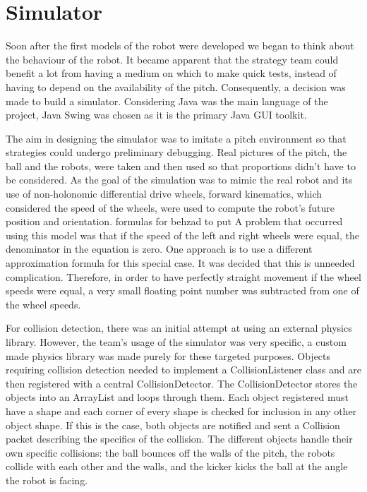 \section{Simulator}

Soon after the first models of the robot were developed we began to think about the behaviour of the robot. It became apparent that the strategy team could benefit a lot from having a medium on which to make quick tests, instead of having to depend on the availability of the pitch. Consequently, a decision was made to build a simulator. Considering Java was the main language of the project, Java Swing was chosen as it is the primary Java GUI toolkit.\linebreak

The aim in designing the simulator was to imitate a pitch environment so that strategies could undergo preliminary debugging. Real pictures of the pitch, the ball and the robots, were taken and then used so that proportions didn’t have to be considered. As the goal of the simulation was to mimic the real robot and its use of  non-holonomic differential drive wheels, forward kinematics, which considered the speed of the wheels, were used to compute the robot’s future position and orientation.\linebreak
formulas for behzad to put
A problem that occurred using this model was that if the speed of the left and right wheels were equal, the denominator in the equation is zero. One approach is to use a different approximation formula for this special case. It was decided that this is unneeded complication. Therefore, in order to have perfectly straight movement if the wheel speeds were equal, a very small floating point number was subtracted from one of the wheel speeds.\linebreak

For collision detection, there was an initial attempt at using an external physics library. However, the team’s usage of the simulator was very specific, a custom made physics library was made purely for these targeted purposes. Objects requiring collision detection needed to implement a CollisionListener class and are then registered with a central CollisionDetector. The CollisionDetector stores the objects into an ArrayList and loops through them. Each object registered must have a shape and each corner of every shape is checked for inclusion in any other object shape. If this is the case, both objects are notified and sent a Collision packet describing the specifics of the collision. The different objects handle their own specific collisions: the ball bounces off the walls of the pitch, the robots collide with each other and the walls, and the kicker kicks the ball at the angle the robot is facing. \linebreak

